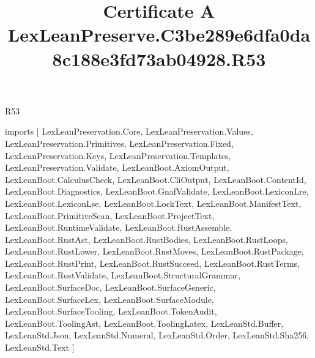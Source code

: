 \begin{lexlean}{R53}
\title{Certificate A LexLeanPreserve.C3be289e6dfa0da8c188e3fd73ab04928.R53}
\begin{coremodule}
imports [
  LexLeanPreservation.Core,
  LexLeanPreservation.Values,
  LexLeanPreservation.Primitives,
  LexLeanPreservation.Fixed,
  LexLeanPreservation.Keys,
  LexLeanPreservation.Templates,
  LexLeanPreservation.Validate,
  LexLeanBoot.AxiomOutput,
  LexLeanBoot.CalculusCheck,
  LexLeanBoot.CliOutput,
  LexLeanBoot.ContentId,
  LexLeanBoot.Diagnostics,
  LexLeanBoot.GnafValidate,
  LexLeanBoot.LexiconLre,
  LexLeanBoot.LexiconLse,
  LexLeanBoot.LockText,
  LexLeanBoot.ManifestText,
  LexLeanBoot.PrimitiveScan,
  LexLeanBoot.ProjectText,
  LexLeanBoot.RuntimeValidate,
  LexLeanBoot.RustAssemble,
  LexLeanBoot.RustAst,
  LexLeanBoot.RustBodies,
  LexLeanBoot.RustLoops,
  LexLeanBoot.RustLower,
  LexLeanBoot.RustMoves,
  LexLeanBoot.RustPackage,
  LexLeanBoot.RustPrint,
  LexLeanBoot.RustSucceed,
  LexLeanBoot.RustTerms,
  LexLeanBoot.RustValidate,
  LexLeanBoot.StructuralGrammar,
  LexLeanBoot.SurfaceDoc,
  LexLeanBoot.SurfaceGeneric,
  LexLeanBoot.SurfaceLex,
  LexLeanBoot.SurfaceModule,
  LexLeanBoot.SurfaceTooling,
  LexLeanBoot.TokenAudit,
  LexLeanBoot.ToolingAst,
  LexLeanBoot.ToolingLatex,
  LexLeanStd.Buffer,
  LexLeanStd.Json,
  LexLeanStd.Numeral,
  LexLeanStd.Order,
  LexLeanStd.Sha256,
  LexLeanStd.Text
]


\end{coremodule}
\end{lexlean}
